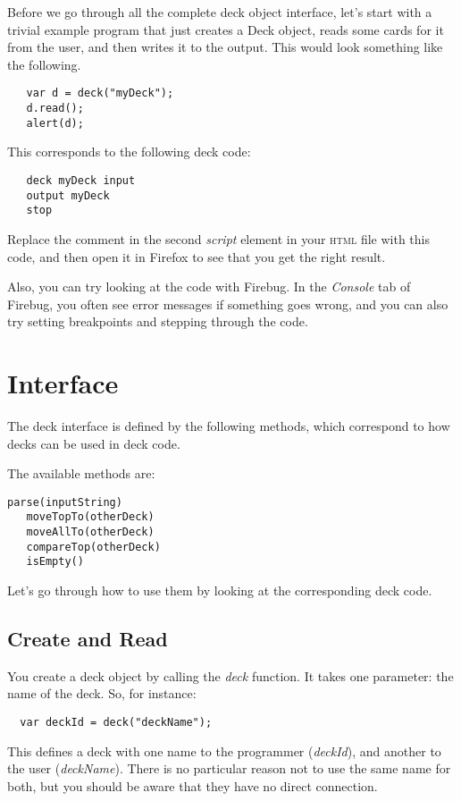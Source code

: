 \documentclass[a4paper,twoside]{tufte-handout}
\begin{document}
Before we go through all the complete deck object interface, let's start with a trivial example program that just creates
a Deck object, reads some cards for it from the user, and then writes
it to the output. This would look something like the following.
\begin{lstlisting}
   var d = deck("myDeck");
   d.read();
   alert(d);
\end{lstlisting}
This corresponds to the following deck code:
\begin{lstlisting}
   deck myDeck input
   output myDeck
   stop
\end{lstlisting}

Replace the comment in the second \emph{script} element in your
\textsc{html} file with this code, and then open it in Firefox to see
that you get the right result.

Also, you can try looking at the code with Firebug. In the
\emph{Console} tab of Firebug, you often see error messages if
something goes wrong, and you can also try setting breakpoints and
stepping through the code.

\section{Interface}\label{sec-intf}

The deck interface is defined by the following methods, which
correspond to how decks can be used in deck code.

The available methods are:
\begin{lstlisting}[frame=none]
   parse(inputString)
   moveTopTo(otherDeck)
   moveAllTo(otherDeck)
   compareTop(otherDeck)
   isEmpty()
\end{lstlisting}
Let's go through how to use them by looking at the corresponding
deck code.

\subsection{Create and Read}\label{sec-input}

You create a deck object by calling the \emph{deck} function. It takes
one parameter: the name of the deck. So, for instance:
\begin{lstlisting}
  var deckId = deck("deckName");
\end{lstlisting}
This defines a deck with one name to the programmer (\emph{deckId}),
and another to the user (\emph{deckName}). There is no particular
reason not to use the same name for both, but you should be aware that
they have no direct connection.
\end{document}
